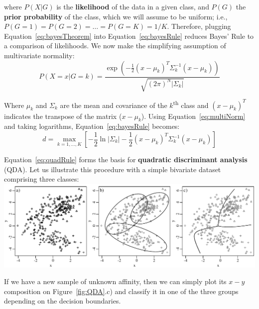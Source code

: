 where $P(X|G)$ is the \textbf{likelihood} of the data in a given
class, and $P(G)$ the \textbf{prior probability} of the class, which
we will assume to be uniform; i.e., $P(G=1)=P(G=2)=\ldots=P(G=K)=1/K$.
Therefore, plugging Equation~\ref{eq:bayesTheorem} into
Equation~\ref{eq:bayesRule} reduces Bayes' Rule to a comparison of
likelihoods.  We now make the simplifying assumption of multivariate
normality:
\begin{equation}
  \label{eq:multiNorm}
  P(X=x|G=k) = \frac{\exp \left( -\frac{1}{2}(x-\mu_k)^T\Sigma_k^{-1}(x-\mu_k) \right)}{\sqrt{(2\pi)^N|\Sigma_k|}}
\end{equation}

Where $\mu_k$ and $\Sigma_k$ are the mean and covariance of the
$k$\textsuperscript{th} class and $(x-\mu_k)^T$ indicates the
transpose of the matrix ($x-\mu_k$).  Using
Equation~\ref{eq:multiNorm} and taking logarithms,
Equation~\ref{eq:bayesRule} becomes:
\begin{equation}
  \label{eq:quadRule}
  d = \underset{k=1,\ldots,K}{\max}
  \left[-\frac{1}{2}\ln|\Sigma_k| -
    \frac{1}{2}(x-\mu_k)^T\Sigma_k^{-1}(x-\mu_k)\right]
\end{equation}

Equation~\ref{eq:quadRule} forms the basis for \textbf{quadratic
  discriminant analysis} (QDA). Let us illustrate this procedure with
a simple bivariate dataset comprising three classes:\\

\noindent\includegraphics[width=\linewidth]{../figures/QDA.pdf}
\begingroup {}
\label{fig:QDA}\endgroup

If we have a new sample of unknown affinity, then we can simply plot
its $x-y$ composition on Figure~\ref{fig:QDA}.c) and classify it in
one of the three groups depending on the decision boundaries.\\

